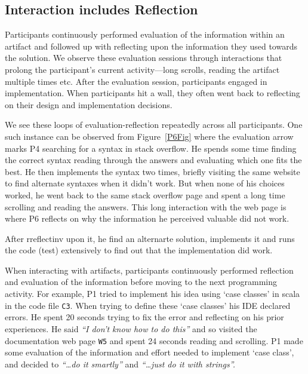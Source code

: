 
\subsection{Interaction includes Reflection}


Participants continuously performed evaluation of the information within an artifact and followed up with reflecting upon the information they used towards the solution. We observe these evaluation sessions through interactions that prolong the participant's current activity---long scrolls, reading the artifact multiple times etc. After the evaluation session, participants engaged in implementation. When participants hit a wall, they often went back to reflecting on their design and implementation decisions. 

We see these loops of evaluation-reflection repeatedly across all participants. One such instance can be observed from Figure~\ref{P6Fig} where the evaluation arrow marks P4 searching for a syntax in stack overflow. He spends some time finding the correct syntax reading through the answers and evaluating which one fits the best. He then implements the syntax two times, briefly visiting the same website to find alternate syntaxes when it didn't work. But when none of his choices worked, he went back to the same stack overflow page and spent a long time scrolling and reading the answers. This long interaction with the web page is where P6 reflects on why the information he perceived valuable did not work. 

After rreflectinv upon it, he find an alternarte solution, implements it and runs the code (test) extensively to find out that the implementation did work.

When interacting with artifacts, participants continuously performed reflection and evaluation of the information before moving to the next programming activity. For example, P1 tried to implement his idea using `case classes' in scala in the code file \texttt{C3}. When trying to define these `case classes' his IDE declared errors. He spent 20 seconds trying to fix the error and reflecting on his prior experiences. He said \emph{``I don't know how to do this''} and so visited the documentation web page \texttt{W5} and spent 24 seconds reading and scrolling. P1 made some evaluation of the information and effort needed to implement `case class', and decided to \emph{``\dots do it smartly''} and \emph{``\dots just do it with strings''.}

